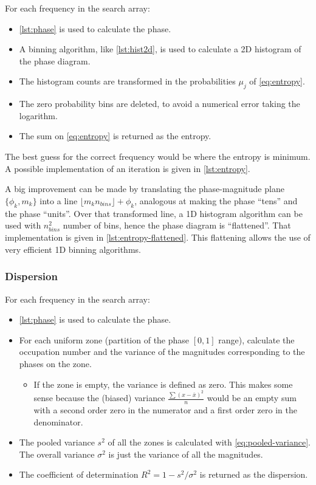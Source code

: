 For each frequency in the search array:

\begin{itemize}
	\item \autoref{lst:phase} is used to calculate the phase.
	\item A binning algorithm, like \autoref{lst:hist2d}, is used to calculate a 2D histogram of the phase diagram.
	\item The histogram counts are transformed in the probabilities $\mu_j$ of \autoref{eq:entropy}.
	\item The zero probability bins are deleted, to avoid a numerical error taking the logarithm.
	\item The sum on \autoref{eq:entropy} is returned as the entropy.
\end{itemize}

The best guess for the correct frequency would be where the entropy is minimum.
A possible implementation of an iteration is given in \autoref{lst:entropy}.

A big improvement can be made by translating the phase-magnitude plane $\{\phi_k,m_k\}$ into a line $\lfloor m_k n_{bins} \rfloor + \phi_k$,
analogous at making the phase \enquote{tens} and the phase \enquote{units}.
Over that transformed line, a 1D histogram algorithm can be used with $n_{bins}^2$ number of bins, hence the phase diagram is \enquote{flattened}. 
That implementation is given in \autoref{lst:entropy-flattened}. 
This flattening allows the use of very efficient 1D binning algorithms.

\subsubsection{Dispersion}

For each frequency in the search array:
\begin{itemize}
	\item \autoref{lst:phase} is used to calculate the phase.
	\item For each uniform zone (partition of the phase $[0,1]$ range), 
	calculate the occupation number and the variance of the magnitudes corresponding to the phases on the zone.
	\begin{itemize}
		\item If the zone is empty, the variance is defined as zero. This makes some sense because the (biased) variance 
		$\frac{\sum(x-\bar{x})^2}{n}$ would be an empty sum with a second order zero in the numerator and a first order zero in the denominator.
	\end{itemize}
	\item The pooled variance $s^2$ of all the zones is calculated with \autoref{eq:pooled-variance}. 
	The overall variance $\sigma^2$ is just the variance of all the magnitudes.
	\item The coefficient of determination $R^2=1-s^2/\sigma^2$ is returned as the dispersion.
\end{itemize}

